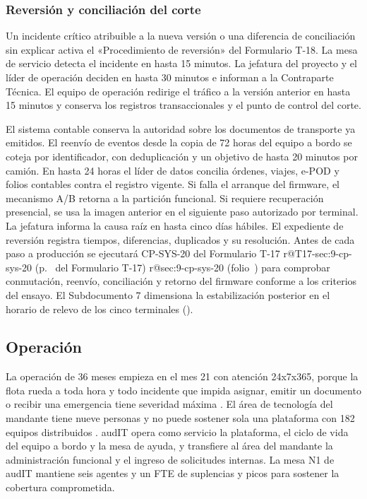 \subsubsection{Reversión y conciliación del corte}\label{sec:3-reversion}

Un incidente crítico atribuible a la nueva versión o una diferencia de conciliación sin explicar activa
el «Procedimiento de reversión» del Formulario T-18. La mesa de servicio detecta el incidente en hasta
15 minutos. La jefatura del proyecto y el líder de operación deciden en hasta 30 minutos e informan a
la Contraparte Técnica. El equipo de operación redirige el tráfico a la versión anterior en hasta
15 minutos y conserva los registros transaccionales y el punto de control del corte.

El sistema contable conserva la autoridad sobre los documentos de transporte ya emitidos. El reenvío
de eventos desde la copia de 72 horas del equipo a bordo se coteja por identificador, con deduplicación
y un objetivo de hasta 20 minutos por camión. En hasta 24 horas el líder de datos concilia órdenes,
viajes, e-POD y folios contables contra el registro vigente. Si falla el arranque del firmware, el
mecanismo A/B retorna a la partición funcional. Si requiere recuperación presencial, se usa la
imagen anterior en el siguiente paso autorizado por terminal. La jefatura informa la causa raíz
en hasta cinco días hábiles. El expediente de reversión registra tiempos, diferencias, duplicados
y su resolución. Antes de cada paso a producción se ejecutará CP-SYS-20 del Formulario T-17
\ifcsname r@T17-sec:9-cp-sys-20\endcsname
  (p.~ del Formulario T-17)
\else
  \ifcsname r@sec:9-cp-sys-20\endcsname
    (folio~)
  \fi
\fi
para comprobar conmutación, reenvío, conciliación y retorno del firmware conforme a los
criterios del ensayo. El Subdocumento 7 dimensiona la estabilización posterior en el horario
de relevo de los cinco terminales ().

\subsection{Operación}\label{sec:3-operacion}

La operación de 36 meses empieza en el mes 21 con atención 24x7x365, porque la flota rueda a toda hora y
todo incidente que impida asignar, emitir un documento o recibir una emergencia tiene severidad máxima
. El área de tecnología del mandante tiene nueve personas y no puede sostener sola una
plataforma con 182 equipos distribuidos . audIT opera como servicio
la plataforma, el ciclo de vida del equipo a bordo y la mesa de ayuda, y transfiere al área del mandante la
administración funcional y el ingreso de solicitudes internas. La mesa N1 de audIT mantiene
seis agentes y un FTE de suplencias y picos para sostener la cobertura comprometida.

